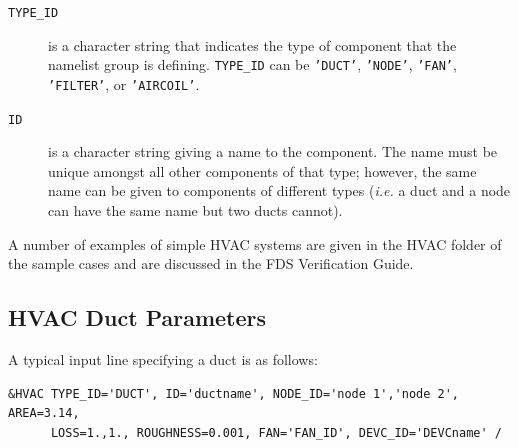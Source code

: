 \documentclass[11pt]{book}
\newcommand{\ct}{\tt\small}
\begin{document}
\begin{description}
\item[{\ct TYPE\_ID}] is a character string that indicates the type of component that the namelist group is defining.   {\ct TYPE\_ID} can be {\ct 'DUCT'}, {\ct 'NODE'}, {\ct 'FAN'}, {\ct 'FILTER'}, or {\ct 'AIRCOIL'}.
\item[{\ct ID}] is a character string giving a name to the component.  The name must be unique amongst all other components of that type; however, the same name can be given to components of different types ({\em i.e.} a duct and a node can have the same name but two ducts cannot).
\end{description}
A number of examples of simple HVAC systems are given in the HVAC folder of the sample cases and are discussed in the FDS Verification Guide.


\subsection{HVAC Duct Parameters}
\label{info:HVACduct}

A typical input line specifying a duct is as follows:

\footnotesize
\begin{verbatim}
&HVAC TYPE_ID='DUCT', ID='ductname', NODE_ID='node 1','node 2', AREA=3.14,
      LOSS=1.,1., ROUGHNESS=0.001, FAN='FAN_ID', DEVC_ID='DEVCname' /
\end{verbatim}\normalsize
\end{document}
